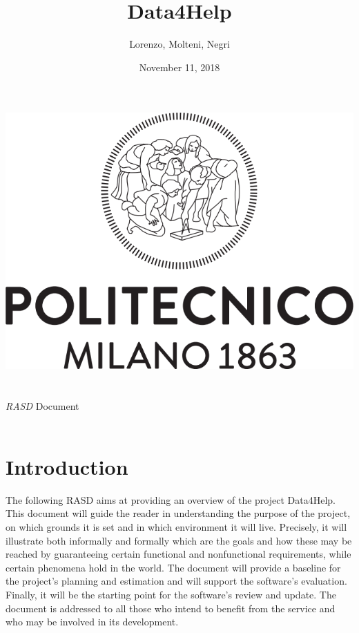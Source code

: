 \documentclass[titlepage]{article}
\title{{\Huge Data4Help}}
\author{Lorenzo, Molteni, Negri}
\date{November 11, 2018}
\begin{document}
\makeatletter
    \begin{titlepage}
        \begin{center}
            \includegraphics[width=\linewidth]{logo.png}\\[20ex]
            {\huge  \@title }\\[2ex] 
            {\LARGE  \@author}\\[3ex] 
            {\LARGE {\it RASD} Document}\\[3ex]
            {\large \@date}\\[5ex]
        \end{center}
    \end{titlepage}
\makeatother
\thispagestyle{empty}
\newpage

\thispagestyle{empty}
\newpage


	
\pagebreak
\tableofcontents{}
\pagebreak


\section{Introduction}
The following RASD aims at providing an overview of the project Data4Help. This document will guide the reader in understanding the purpose of the project, on which grounds it is set and in which environment it will live. Precisely, it will illustrate both informally and formally which are the goals and how these may be reached by guaranteeing certain functional and nonfunctional requirements, while certain phenomena hold in the world.
The document will provide a baseline for the project’s planning and estimation and will support the software’s evaluation. 
Finally, it will be the starting point for the software’s review and update.
The document is addressed to all those who intend to benefit from the service and who may be involved in its development. 
\end{document}
